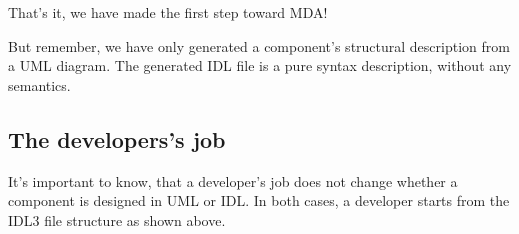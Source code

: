 That's it, we have made the first step toward MDA! 

But remember, we have only generated a component's structural description from
a UML diagram. The generated IDL file is a pure syntax description, without 
any semantics.  


\subsection{The developers's job}

It's important to know, that a developer's job does not change whether a 
component is designed in UML or IDL.
In both cases, a developer starts from the IDL3 file structure as shown above.
